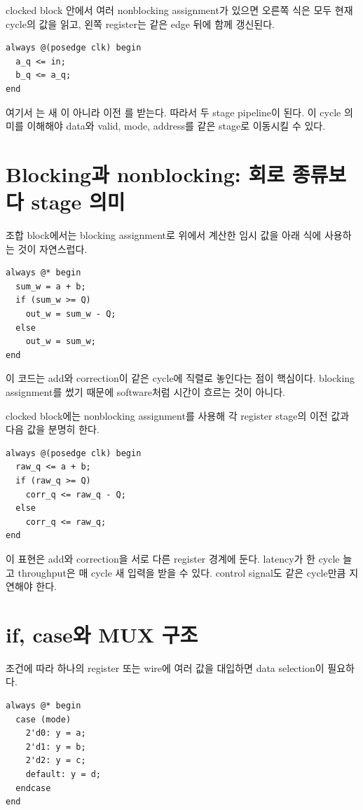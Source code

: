 clocked block 안에서 여러 nonblocking assignment가 있으면 오른쪽 식은 모두
현재 cycle의 값을 읽고, 왼쪽 register는 같은 edge 뒤에 함께 갱신된다.

\begin{lstlisting}
always @(posedge clk) begin
  a_q <= in;
  b_q <= a_q;
end
\end{lstlisting}

여기서 는 새 이 아니라 이전 를 받는다.
따라서 두 stage pipeline이 된다. 이 cycle 의미를 이해해야 data와 valid, mode,
address를 같은 stage로 이동시킬 수 있다.

\section{Blocking과 nonblocking: 회로 종류보다 stage 의미}

조합 block에서는 blocking assignment로 위에서 계산한 임시 값을 아래 식에
사용하는 것이 자연스럽다.

\begin{lstlisting}
always @* begin
  sum_w = a + b;
  if (sum_w >= Q)
    out_w = sum_w - Q;
  else
    out_w = sum_w;
end
\end{lstlisting}

이 코드는 add와 correction이 같은 cycle에 직렬로 놓인다는 점이 핵심이다.
blocking assignment를 썼기 때문에 software처럼 시간이 흐르는 것이 아니다.

clocked block에는 nonblocking assignment를 사용해 각 register stage의 이전 값과
다음 값을 분명히 한다.

\begin{lstlisting}
always @(posedge clk) begin
  raw_q <= a + b;
  if (raw_q >= Q)
    corr_q <= raw_q - Q;
  else
    corr_q <= raw_q;
end
\end{lstlisting}

이 표현은 add와 correction을 서로 다른 register 경계에 둔다. latency가 한
cycle 늘고 throughput은 매 cycle 새 입력을 받을 수 있다. control signal도 같은
cycle만큼 지연해야 한다.

\section{if, case와 MUX 구조}

조건에 따라 하나의 register 또는 wire에 여러 값을 대입하면 data selection이
필요하다.

\begin{lstlisting}
always @* begin
  case (mode)
    2'd0: y = a;
    2'd1: y = b;
    2'd2: y = c;
    default: y = d;
  endcase
end
\end{lstlisting}

